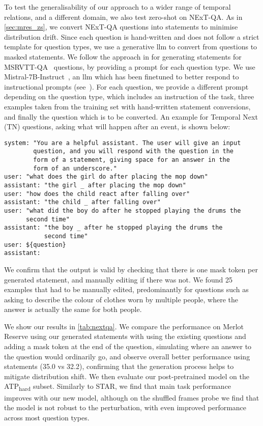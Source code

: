 To test the generalisability of our approach to a wider range of temporal
relations, and a different domain, we also test zero-shot on NExT-QA. As in
\cref{sec:mres_zs}, we convert NExT-QA questions into statements to minimise
distribution drift. Since each question is hand-written and does not follow a
strict template for question types, we use a generative \acrshort{llm} to
convert from questions to masked statements. We follow the approach in
\citet{zellers2022mreserve} for generating statements for
MSRVTT-QA~\citep{xu2016msr-vtt} questions, by providing a prompt for each
question type. We use Mistral-7B-Instruct~\citep{jiang2023mistral}, an
\acrshort{llm} which has been finetuned to better respond to instructional
prompts (see~\citet{ouyang2022instructgpt}). For each question, we provide a
different prompt depending on the question type, which includes an instruction
of the task, three examples taken from the training set with hand-written
statement conversions, and finally the question which is to be converted. An
example for Temporal Next (TN) questions, asking what will happen after an
event, is shown below:

\begin{verbatim}
system: "You are a helpful assistant. The user will give an input
        question, and you will respond with the question in the
        form of a statement, giving space for an answer in the
        form of an underscore."
user: "what does the girl do after placing the mop down"
assistant: "the girl _ after placing the mop down"
user: "how does the child react after falling over"
assistant: "the child _ after falling over"
user: "what did the boy do after he stopped playing the drums the 
      second time"
assistant: "the boy _ after he stopped playing the drums the 
           second time"
user: ${question}
assistant: 
\end{verbatim}

We confirm that the output is valid by checking that there is one mask token
per generated statement, and manually editing if there was not. We found 25
examples that had to be manually edited, predominantly for questions such as
asking to describe the colour of clothes worn by multiple people, where the
answer is actually the same for both people.

We show our results in \cref{tab:nextqa}. We compare the performance on Merlot
Reserve using our generated statements with using the existing questions and
adding a mask token at the end of the question, simulating where an answer to
the question would ordinarily go, and observe overall better performance using
statements (35.0 vs 32.2), confirming that the generation process helps to
mitigate distribution shift. We then evaluate our post-pretrained model on the
ATP\textsubscript{hard} subset. Similarly to STAR, we find that main task
performance improves with our new model, although on the shuffled frames probe
we find that the model is not robust to the perturbation, with even improved
performance across most question types.

